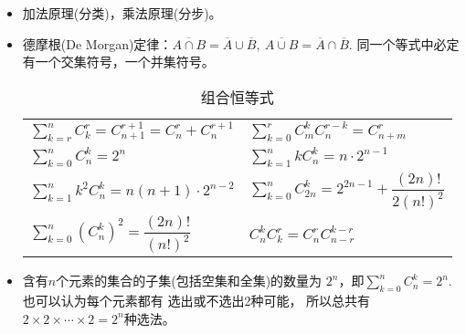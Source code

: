 \begin{itemize}[leftmargin=\inteval{\myitemleftmargin}pt,itemsep=
   \inteval{\myitemitempsep}pt,topsep=\inteval{\myitemtopsep}pt]
\begin{align*}
    &\cdots \\
    F_n=&\  C_{n-1}^0+C_{n-2}^1+\cdots+C_{n-1-m}^m\quad \left(m=\left\lfloor
    \frac{n-1}{2} \right\rfloor\right)   
\end{align*}
其中，$ \lfloor x \rfloor $表示向下取整，即不超过$ x $的最大整数，比如
$ \lfloor 4.3 \rfloor=4,\ \lfloor 6.9 \rfloor=6 $. 
\item 加法原理(分类)，乘法原理(分步)。
\item 德摩根(De Morgan)定律：$ \overline{A \cap B}=\overline{A}\cup 
\overline{B},\ \overline{A \cup B}=\overline{A}\cap \overline{B} $. 
同一个等式中必定有一个交集符号，一个并集符号。

\begin{table}[h] 
\caption{组合恒等式} 
\centering
\begin{tabular}{l|l} \label{组合恒等式}
    $\sum\limits_{k=r}^{n} C_k^r=C_{n+1}^{r+1}=C_n^r+C_n^{r+1}$  &		
    $\sum\limits_{k=0}^{r}C_m^kC_n^{r-k}=C_{n+m}^r $     \\
    $\sum\limits_{k=0}^{n} C_n^k=2^{n} $		&
    $\sum\limits_{k=1}^{n} kC_n^k=n\cdot2^{n-1} $  \\
    $\sum\limits_{k=1}^{n} k^2C_n^k=n(n+1)\cdot2^{n-2} $  &
    $\sum\limits_{k=0}^{n} C_{2n}^k=2^{2n-1}+\dfrac{(2n)!}{2(n!)^2} $  \\
    $\sum\limits_{k=0}^{n} \left( C_{n}^k\right) ^2=\dfrac{(2n)!}{(n!)^2} $  &
    $C_n^kC_k^r=C_n^rC_{n-r}^{k-r} $
\end{tabular}
\end{table} 
\item 含有$ n $个元素的集合的子集(包括空集和全集)的数量为
$ 2^n $，即$\sum\limits_{k=0}^{n} C_n^k=2^{n} $. 也可以认为每个元素都有
选出或不选出2种可能，
所以总共有$2\times 2\times \cdots\times 2= 2^n $种选法。


\end{itemize}
